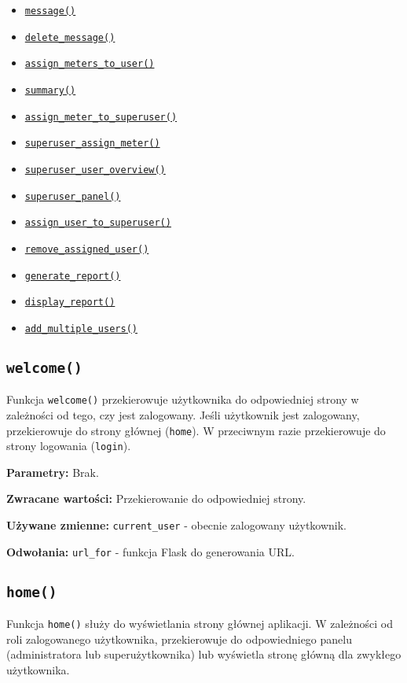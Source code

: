 \documentclass[12pt,a4paper]{report}
\begin{document}
\begin{itemize}
    \item \hyperref[sec:message]{\texttt{message()}}
    \item \hyperref[sec:delete_message]{\texttt{delete\_message()}}
    \item \hyperref[sec:assign_meters_to_user]{\texttt{assign\_meters\_to\_user()}}
    \item \hyperref[sec:summary]{\texttt{summary()}}
    \item \hyperref[sec:assign_meter_to_superuser]{\texttt{assign\_meter\_to\_superuser()}}
    \item \hyperref[sec:superuser_assign_meter]{\texttt{superuser\_assign\_meter()}}
    \item \hyperref[sec:superuser_user_overview]{\texttt{superuser\_user\_overview()}}
    \item \hyperref[sec:superuser_panel]{\texttt{superuser\_panel()}}
    \item \hyperref[sec:assign_user_to_superuser]{\texttt{assign\_user\_to\_superuser()}}
    \item \hyperref[sec:remove_assigned_user]{\texttt{remove\_assigned\_user()}}
    \item \hyperref[sec:generate_report]{\texttt{generate\_report()}}
    \item \hyperref[sec:display_report]{\texttt{display\_report()}}
    \item \hyperref[sec:add_multiple_users]{\texttt{add\_multiple\_users()}}
\end{itemize}

\subsection{\texttt{welcome()}}
\label{sec:welcome}
Funkcja \texttt{welcome()} przekierowuje użytkownika do odpowiedniej strony w zależności od tego, czy jest zalogowany. Jeśli użytkownik jest zalogowany, przekierowuje do strony głównej (\texttt{home}). W przeciwnym razie przekierowuje do strony logowania (\texttt{login}).

\textbf{Parametry:} Brak.

\textbf{Zwracane wartości:} Przekierowanie do odpowiedniej strony.

\textbf{Używane zmienne:} \texttt{current\_user} - obecnie zalogowany użytkownik.

\textbf{Odwołania:} \texttt{url\_for} - funkcja Flask do generowania URL.

\subsection{\texttt{home()}}
\label{sec:home}
Funkcja \texttt{home()} służy do wyświetlania strony głównej aplikacji. W zależności od roli zalogowanego użytkownika, przekierowuje do odpowiedniego panelu (administratora lub superużytkownika) lub wyświetla stronę główną dla zwykłego użytkownika.
\end{document}
